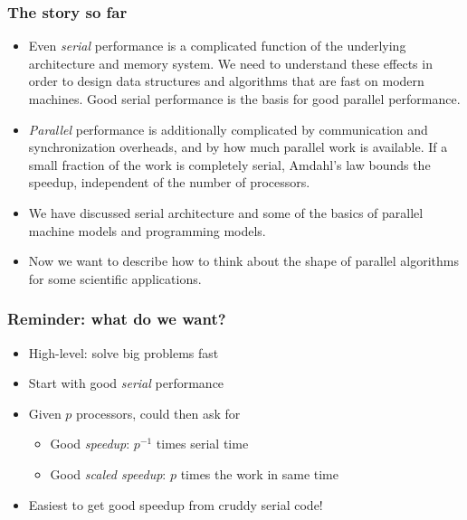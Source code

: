 \documentclass{beamer}
\begin{document}
\begin{frame}
  \frametitle{The story so far}

  \begin{itemize}
  \item Even {\em serial} performance is a complicated function of
        the underlying architecture and memory system.  We need to
        understand these effects in order to design data structures
        and algorithms that are fast on modern machines.  Good
        serial performance is the basis for good parallel performance.
  \item {\em Parallel} performance is additionally complicated by
        communication and synchronization overheads, and by how
        much parallel work is available.  If a small fraction of the
        work is completely serial, Amdahl's law bounds the speedup,
        independent of the number of processors.
  \item We have discussed serial architecture and some of the basics
        of parallel machine models and programming models.
  \item Now we want to describe how to think about the shape of
        parallel algorithms for some scientific applications.
  \end{itemize}
\end{frame}

\begin{frame}
  \frametitle{Reminder: what do we want?}

  \begin{itemize}
  \item High-level: solve big problems fast
  \item Start with good {\em serial} performance
  \item Given $p$ processors, could then ask for
    \begin{itemize}
    \item Good {\em speedup}: $p^{-1}$ times serial time
    \item Good {\em scaled speedup}: $p$ times the work in same time
    \end{itemize}
  \item Easiest to get good speedup from cruddy serial code!
  \end{itemize}
\end{frame}
\end{document}
